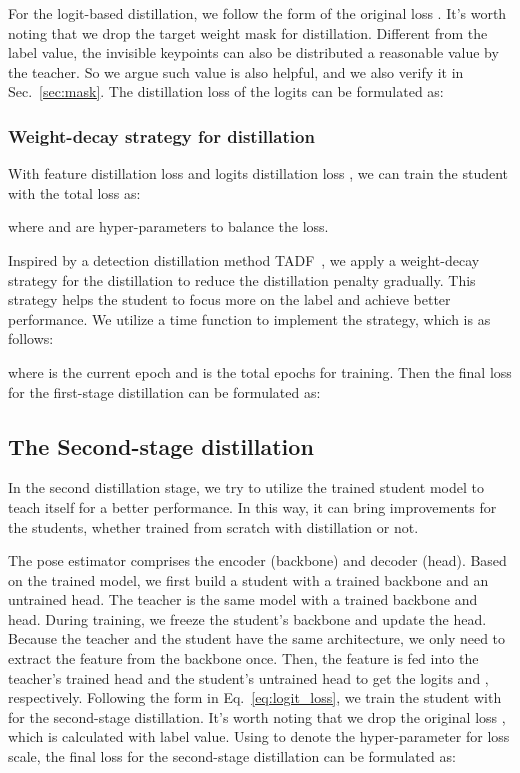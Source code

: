 \documentclass[10pt,twocolumn,letterpaper]{article}
\begin{document}
For the logit-based distillation, we follow the form of the original loss . It's worth noting that we drop the target weight mask  for distillation. Different from the label value, the invisible keypoints can also be distributed a reasonable value by the teacher. So we argue such value is also helpful, and we also verify it in Sec.~\ref{sec:mask}. The distillation loss of the logits can be formulated as:




\subsubsection{Weight-decay strategy for distillation}
With feature distillation loss  and logits distillation loss , we can train the student with the total loss as:

where  and  are hyper-parameters to balance the loss.

Inspired by a detection distillation method TADF~\cite{sun2020distilling}, we apply a weight-decay strategy for the distillation to reduce the distillation penalty gradually. This strategy helps the student to focus more on the label and achieve better performance. We utilize a time function  to implement the strategy, which is as follows:

where  is the current epoch and  is the total epochs for training. Then the final loss for the first-stage distillation can be formulated as:


\subsection{The Second-stage distillation}
\label{sec:s2}
In the second distillation stage, we try to utilize the trained student model to teach itself for a better performance. In this way, it can bring improvements for the students, whether trained from scratch with distillation or not.


The pose estimator comprises the encoder (backbone) and decoder (head). Based on the trained model, we first build a student with a trained backbone and an untrained head. The teacher is the same model with a trained backbone and head. During training, we freeze the student's backbone and update the head. Because the teacher and the student have the same architecture, we only need to extract the feature from the backbone once. Then, the feature is fed into the teacher's trained head and the student's untrained head to get the logits  and , respectively. Following the form in Eq.~\ref{eq:logit_loss}, we train the student with  for the second-stage distillation. It's worth noting that we drop the original loss , which is calculated with label value. Using  to denote the hyper-parameter for loss scale, the final loss for the second-stage distillation can be formulated as:
\end{document}
